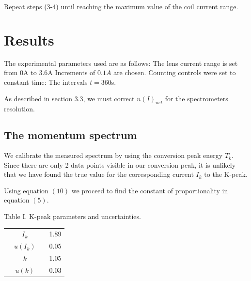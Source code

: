 \documentclass[10pt, a4paper]{article}
\begin{document}
\begin{multicols}{2}
\begin{enumerate}
Repeat steps (3-4) until reaching the maximum value of the coil current range.
\end{enumerate}

\section{Results}

The experimental parameters used are as follows:
The lens current range is set from $0$A to $3.6$A
Increments of $0.1A$ are chosen. 
Counting controls were set to constant time: The intervals $t = 360$s.

As described in section 3.3, we must correct $n(I)_{net}$ for the spectrometers resolution.

\subsection{The momentum spectrum}
We calibrate the measured spectrum by using the conversion peak energy $T_k$. 
Since there are only 2 data points visible in our conversion peak, it is unlikely that we have found the true 
value for the corresponding current $I_k$ to the K-peak.

Using equation $(10)$ we proceed to find the constant of proportionality in equation $(5)$.

Table I. K-peak parameters and uncertainties.
\begin{center}
\begin{tabular}{ c c c c }
\hline
\hline
\phantom & $I_k$ & \phantom & 1.89 \\ 
\phantom & $u(I_k)$ & \phantom & 0.05  \\
\phantom & $k$ & \phantom & 1.05  \\
\phantom & $u(k)$ & \phantom & 0.03 \\
\hline
\hline
\end{tabular}
\end{center}



\end{multicols}
\end{document}
